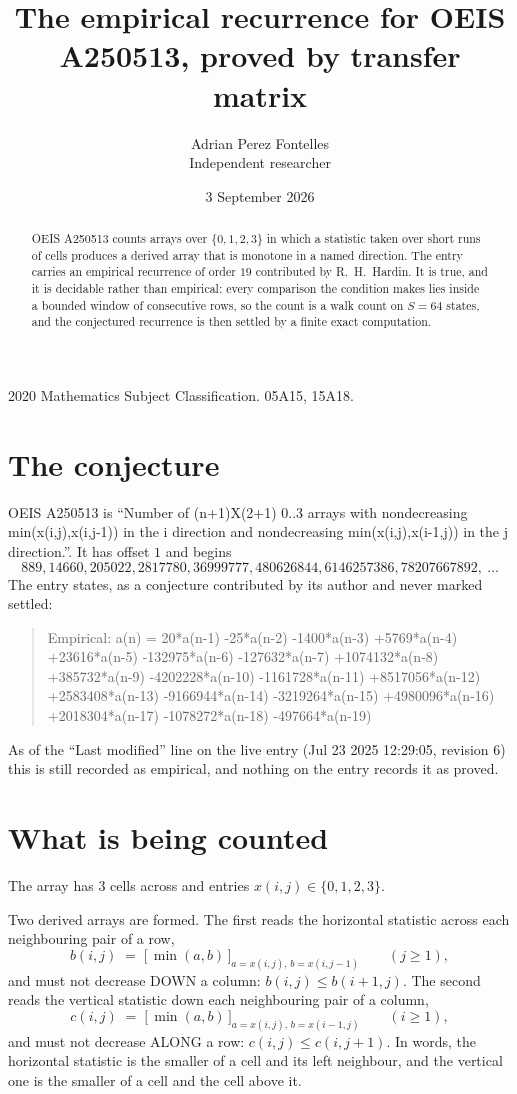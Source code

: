 \documentclass[11pt,a4paper]{article}
\title{The empirical recurrence for OEIS A250513, proved by transfer matrix}
\author{Adrian Perez Fontelles\\ \small Independent researcher}
\date{3 September 2026}
\theoremstyle{plain}
\theoremstyle{definition}
\begin{document}
\maketitle

\begin{abstract}
OEIS A250513 counts arrays over $\{0,1,2,3\}$ in which a statistic taken over short runs
of cells produces a derived array that is monotone in a named direction. The entry carries an
empirical recurrence of order $19$ contributed by R.~H.~Hardin. It is true, and it is
decidable rather than empirical: every comparison the condition makes lies inside a bounded
window of consecutive rows, so the count is a walk count on $S=64$ states, and the
conjectured recurrence is then settled by a finite exact computation.
\end{abstract}

\noindent\small 2020 Mathematics Subject Classification. 05A15, 15A18.\normalsize

\section{The conjecture}

OEIS A250513 is ``Number of (n+1)X(2+1) 0..3 arrays with nondecreasing min(x(i,j),x(i,j-1)) in the i direction and nondecreasing min(x(i,j),x(i-1,j)) in the j direction.''. It has offset $1$ and begins
\[
889, 14660, 205022, 2817780, 36999777, 480626844, 6146257386, 78207667892,\ \dots
\]
The entry states, as a conjecture contributed by its author and never marked settled:
\begin{quote}
Empirical: a(n) = 20*a(n-1) -25*a(n-2) -1400*a(n-3) +5769*a(n-4) +23616*a(n-5) -132975*a(n-6) -127632*a(n-7) +1074132*a(n-8) +385732*a(n-9) -4202228*a(n-10) -1161728*a(n-11) +8517056*a(n-12) +2583408*a(n-13) -9166944*a(n-14) -3219264*a(n-15) +4980096*a(n-16) +2018304*a(n-17) -1078272*a(n-18) -497664*a(n-19)
\end{quote}
As of the ``Last modified'' line on the live entry (Jul 23 2025 12:29:05, revision 6) this is still
recorded as empirical, and nothing on the entry records it as proved.

\section{What is being counted}

The array has $3$ cells across and entries $x(i,j)\in\{0,1,2,3\}$.

Two derived arrays are formed. The first reads the horizontal statistic across each
neighbouring pair of a row,
\[
b(i,j)\;=\;\bigl[\,\min(a,b)\,\bigr]_{a=x(i,j),\,b=x(i,j-1)}\qquad (j\ge1),
\]
and must not decrease DOWN a column: $b(i,j)\le b(i{+}1,j)$. The second reads the vertical
statistic down each neighbouring pair of a column,
\[
c(i,j)\;=\;\bigl[\,\min(a,b)\,\bigr]_{a=x(i,j),\,b=x(i{-}1,j)}\qquad (i\ge1),
\]
and must not decrease ALONG a row: $c(i,j)\le c(i,j{+}1)$. In words, the horizontal statistic
is the smaller of a cell and its left neighbour, and the vertical one is
the smaller of a cell and the cell above it.
\end{document}
